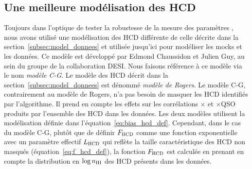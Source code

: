 \documentclass[11pt, twoside, a4paper, openright]{report}
\begin{document}
\subsection{Une meilleure modélisation des HCD}
\label{subsec:model_alter_hcd}
Toujours dans l'optique de tester la robustesse de la mesure des paramètres \lya{}, nous avons utilisé une modélisation des HCD différente de celle décrite dans la section~\ref{subsec:model_donnees} et utilisée jusqu'ici pour modéliser les mocks et les données.
Ce modèle est développé par Edmond Chaussidon et Julien Guy, au sein du groupe \lya{} de la collaboration DESI.
Nous faisons référence à ce modèle via le nom \emph{modèle C-G}. Le modèle des HCD décrit dans la section~\ref{subsec:model_donnees} est dénommé \emph{modèle de Rogers}.
Le modèle C-G, contrairement au modèle de Rogers, n'a pas besoin de masquer les HCD identifiés par l'algorithme. Il prend en compte les effets sur les corrélations \lya{}$\times$\lya{} et \lya{}$\times$QSO produits par l'ensemble des HCD dans les données.
Les deux modèles utilisent la modélisation définie dans l'équation~\ref{eq:bias_hcd_def}.
Cependant, dans le cas du modèle C-G, plutôt que de définir $F_{\textsc{HCD}}$ comme une fonction exponentielle avec un paramètre effectif $L_{\textsc{HCD}}$ qui reflète la taille caractéristique des HCD non masqués (équation~\ref{eq:f_hcd_def}),
la fonction $F_{\textsc{HCD}}$ est calculée en prenant en compte la distribution en $\log n_{\textsc{HI}}$ des HCD présents dans les données.
\end{document}
